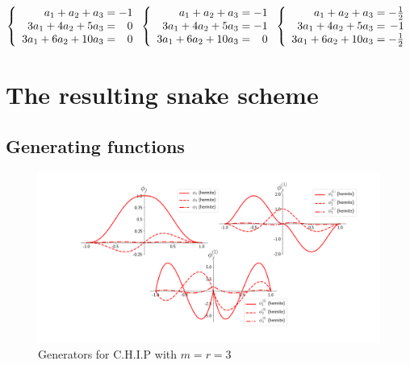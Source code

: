 \documentclass[a4paper, 11pt]{article}
\begin{document}
\begin{equation*}
  \left\{
  \begin{array}{r @{{}={}} r}
    a_1 + a_2  + a_3 & -1 \\
    3a_1 + 4a_2 + 5a_3 & 0 \\
    3a_1 + 6a_2  + 10a_3 & 0\\
  \end{array}
  \right.
  \hfill
  \left\{
  \begin{array}{r @{{}={}} r}
    a_1 + a_2  + a_3 & -1 \\
    3a_1 + 4a_2 + 5a_3 & -1 \\
    3a_1 + 6a_2  + 10a_3 & 0\\
  \end{array}
  \right.
  \hfill
  \left\{
  \begin{array}{r @{{}={}} r}
    a_1 + a_2  + a_3 & -\frac{1}{2} \\
    3a_1 + 4a_2 + 5a_3 & -1 \\
    3a_1 + 6a_2  + 10a_3 & -\frac{1}{2} \\
  \end{array}
  \right.
\end{equation*}

\section{The resulting snake scheme}

\subsection{Generating functions}

\begin{figure}[!h]
  \centering
  \includegraphics[width=\textwidth]{basis.png}
  \caption{Generators for C.H.I.P with $m=r=3$}
  \label{fig:basis}
\end{figure}
\end{document}
